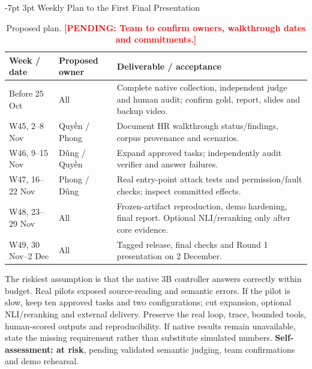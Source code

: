 \documentclass[a4paper,11pt]{article}
\makeatletter
\renewcommand\section{\@startsection{section}{1}{\z@}%
                                   {-7pt \@plus -1pt \@minus -1pt}%
                                   {3pt \@plus 1pt \@minus 1pt}%
                                   {\normalfont\large\bfseries}}
\newcommand{\pending}[1]{\textcolor{red}{\textbf{[PENDING: #1]}}}
\makeatother
\begin{document}
\section{Weekly Plan to the First Final Presentation}
\begin{table}[H]\centering\footnotesize
\begin{tabularx}{\textwidth}{@{}L{1.7cm}L{2.0cm}X@{}}
\toprule Week / date & Proposed owner & Deliverable / acceptance\\\midrule
Before 25 Oct & All & Complete native collection, independent judge and human audit; confirm gold, report, slides and backup video.\\
W45, 2--8 Nov & Quyền / Phong & Document HR walkthrough status/findings, corpus provenance and scenarios.\\
W46, 9--15 Nov & Dũng / Quyền & Expand approved tasks; independently audit verifier and answer failures.\\
W47, 16--22 Nov & Phong / Dũng & Real entry-point attack tests and permission/fault checks; inspect committed effects.\\
W48, 23--29 Nov & All & Frozen-artifact reproduction, demo hardening, final report. Optional NLI/reranking only after core evidence.\\
W49, 30 Nov--2 Dec & All & Tagged release, final checks and Round 1 presentation on 2 December.\\
\bottomrule\end{tabularx}
\caption{Proposed plan. \pending{Team to confirm owners, walkthrough dates and commitments.}}
\end{table}
The riskiest assumption is that the native 3B controller answers correctly within budget. Real pilots exposed source-reading and semantic errors. If the pilot is slow, keep ten approved tasks and two configurations; cut expansion, optional NLI/reranking and external delivery. Preserve the real loop, trace, bounded tools, human-scored outputs and reproducibility. If native results remain unavailable, state the missing requirement rather than substitute simulated numbers.
\textbf{Self-assessment: at risk}, pending validated semantic judging, team confirmations and demo rehearsal.

\clearpage
\end{document}
